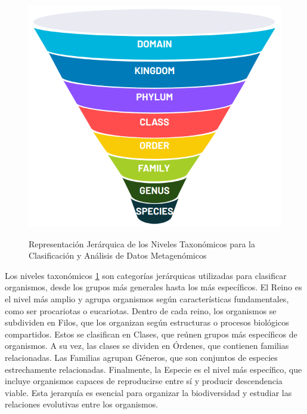 \begin{figure}[h]
\centering
\includegraphics[scale=0.3]{Img/cap1/taxonomic.png}
\label{Fig 1.1}
\caption{Representación Jerárquica de los Niveles Taxonómicos para la Clasificación y Análisis de Datos Metagenómicos}
\end{figure}


Los niveles taxonómicos \ref{Fig 1.1} son categorías jerárquicas utilizadas para clasificar organismos, desde los grupos más generales hasta los más específicos. El Reino es el nivel más amplio y agrupa organismos según características fundamentales, como ser procariotas o eucariotas. Dentro de cada reino, los organismos se subdividen en Filos, que los organizan según estructuras o procesos biológicos compartidos. Estos se clasifican en Clases, que reúnen grupos más específicos de organismos. A su vez, las clases se dividen en Órdenes, que contienen familias relacionadas. Las Familias agrupan Géneros, que son conjuntos de especies estrechamente relacionadas. Finalmente, la Especie es el nivel más específico, que incluye organismos capaces de reproducirse entre sí y producir descendencia viable. Esta jerarquía es esencial para organizar la biodiversidad y estudiar las relaciones evolutivas entre los organismos.\\

